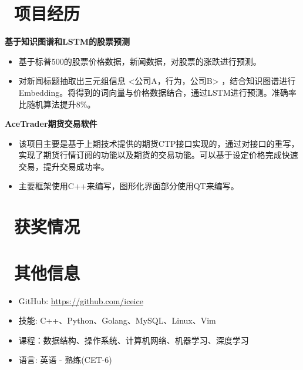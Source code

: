 \documentclass{resume}
\begin{document}
\section{\faArchive \ 项目经历}
\begin{onehalfspacing}
\textbf{基于知识图谱和LSTM的股票预测}
\begin{itemize}
  \item 基于标普500的股票价格数据，新闻数据，对股票的涨跌进行预测。
  \item 对新闻标题抽取出三元组信息 <公司A，行为，公司B> ，结合知识图谱进行Embedding。将得到的词向量与价格数据结合，通过LSTM进行预测。准确率比随机算法提升8\%。
\end{itemize}
\textbf{AceTrader期货交易软件}
\begin{itemize}
  \item 该项目主要是基于上期技术提供的期货CTP接口实现的，通过对接口的重写，实现了期货行情订阅的功能以及期货的交易功能。可以基于设定价格完成快速交易，提升交易成功率。
  \item 主要框架使用C++来编写，图形化界面部分使用QT来编写。
\end{itemize}
\end{onehalfspacing}

\section{\ 获奖情况}
\begin{onehalfspacing}
\end{onehalfspacing}

\section{\ 其他信息}
\begin{itemize}[parsep=0.5ex]
  \item GitHub: \href{https://github.com/iceice}{https://github.com/iceice}
  \item 技能: C++、Python、Golang、MySQL、Linux、Vim
  \item 课程：数据结构、操作系统、计算机网络、机器学习、深度学习
  \item 语言: 英语 - 熟练(CET-6)
\end{itemize}

%
%
\end{document}
